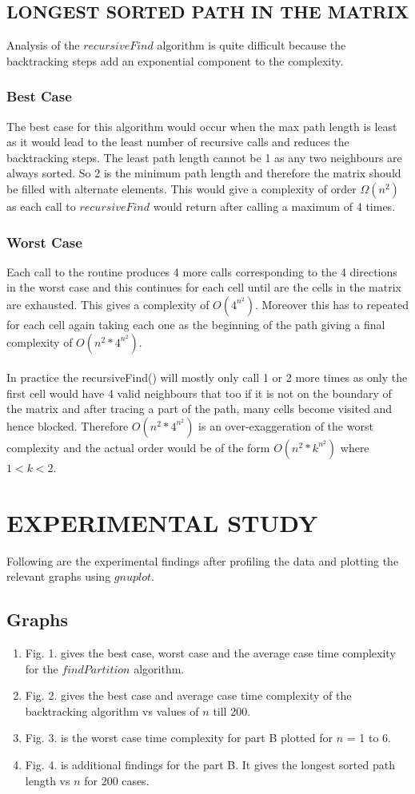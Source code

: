 \documentclass[letterpaper, 11 pt, conference]{ieeeconf}  %
\begin{document}
\subsection{LONGEST SORTED PATH IN THE MATRIX}
Analysis of the $recursiveFind$ algorithm is quite difficult because the backtracking steps add an exponential component to the complexity. 
\subsubsection{Best Case}
The best case for this algorithm would occur when the max path length is least as it would lead to the least number of recursive calls and reduces the backtracking steps. The least path length cannot be 1 as any two neighbours are always sorted. So 2 is the minimum path length and therefore the matrix should be filled with alternate elements. This would give a complexity of order $\Omega(n^2)$ as each call to $recursiveFind$ would return after calling a maximum of 4 times.
\subsubsection{Worst Case} Each call to the routine produces 4 more calls corresponding to the 4 directions in the worst case and this continues for each cell until are the cells in the matrix are exhausted. This gives a complexity of $O(4^{n^2})$. Moreover this has to repeated for each cell again taking each one as the beginning of the path giving a final complexity of $O(n^2 * 4^{n^2})$. \\ 
\\ In practice the recursiveFind() will mostly only call 1 or 2 more times as only the first cell would have 4 valid neighbours that too if it is not on the boundary of the matrix and after tracing a part of the path, many cells become visited and hence blocked. Therefore $O(n^2*4^{n^2})$ is an over-exaggeration of the worst complexity and the actual order would be of the form $O(n^2*k^{n^2})$ where $1 < k < 2$.

\section{EXPERIMENTAL STUDY} 
Following are the experimental findings after profiling the data and plotting the relevant graphs using $gnuplot$.

\subsection{Graphs}
\begin{enumerate}
\item Fig. 1. gives the best case, worst case and the average case time complexity for the $findPartition$ algorithm.
\item Fig. 2. gives the best case and average case time complexity of the backtracking algorithm vs values of $n$ till 200. 
\item Fig. 3. is the worst case time complexity for part B plotted for $n$ = 1 to 6.
\item Fig. 4. is additional findings for the part B. It gives the longest sorted path length vs $n$ for 200 cases.
\end{enumerate}
\end{document}
